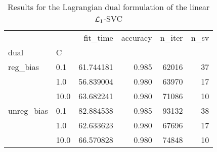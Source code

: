\begin{table}[H]
\centering
\caption{Results for the Lagrangian dual formulation of the linear $\protect \mathcal{L}_1$-SVC}
\label{linear_lagrangian_dual_l1_svc_cv_results}
\begin{tabular}{llrrrr}
\toprule
           &      &   fit\_time &  accuracy &  n\_iter &  n\_sv \\
dual & C &            &           &         &       \\
\midrule
reg\_bias & 0.1  &  61.744181 &     0.985 &   62016 &    37 \\
           & 1.0  &  56.839004 &     0.980 &   63970 &    17 \\
           & 10.0 &  63.682241 &     0.980 &   71086 &    10 \\
unreg\_bias & 0.1  &  82.884538 &     0.985 &   93132 &    38 \\
           & 1.0  &  62.633623 &     0.980 &   67696 &    17 \\
           & 10.0 &  66.570828 &     0.980 &   74848 &    10 \\
\bottomrule
\end{tabular}
\end{table}
